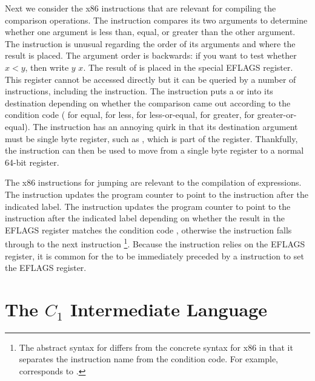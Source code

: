\documentclass[11pt]{book}
\begin{document}
Next we consider the x86 instructions that are relevant for compiling
the comparison operations. The  instruction compares its two
arguments to determine whether one argument is less than, equal, or
greater than the other argument. The  instruction is unusual
regarding the order of its arguments and where the result is
placed. The argument order is backwards: if you want to test whether
$x < y$, then write  $y$\code{,} $x$. The result of
 is placed in the special EFLAGS register. This register
cannot be accessed directly but it can be queried by a number of
instructions, including the  instruction. The 
instruction puts a  or  into its destination depending
on whether the comparison came out according to the condition code
 ( for equal,  for less,  for
less-or-equal,  for greater,  for greater-or-equal).
The  instruction has an annoying quirk in that its
destination argument must be single byte register, such as ,
which is part of the  register.  Thankfully, the
 instruction can then be used to move from a single byte
register to a normal 64-bit register.

The x86 instructions for jumping are relevant to the compilation of
 expressions. The  instruction updates the program
counter to point to the instruction after the indicated label.  The
 instruction updates the program counter to point to the
instruction after the indicated label depending on whether the result
in the EFLAGS register matches the condition code , otherwise
the  instruction falls through to the next instruction
\footnote{The abstract syntax for  differs from the
  concrete syntax for x86 in that it separates the instruction name
  from the condition code. For example, 
  corresponds to .}.  Because the 
instruction relies on the EFLAGS register, it is common for the
 to be immediately preceded by a  instruction to
set the EFLAGS register.


\section{The $C_1$ Intermediate Language}
\label{sec:c1}
\end{document}
